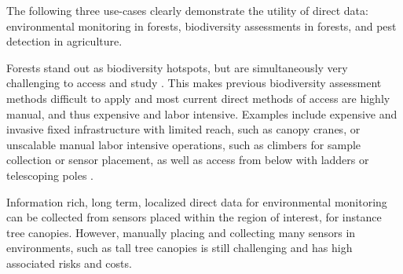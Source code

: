 The following three use-cases clearly demonstrate the utility of direct data: environmental monitoring in forests, biodiversity assessments in forests, and pest detection in agriculture.


Forests stand out as biodiversity hotspots, but are simultaneously very challenging to access and study \cite{Pillay2022, Ozanne2003d}. This makes previous biodiversity assessment methods difficult to apply and most current direct methods of access are highly manual, and thus expensive and labor intensive. Examples include expensive and invasive fixed infrastructure with limited reach, such as canopy cranes, or unscalable manual labor intensive operations, such as climbers for sample collection or sensor placement, as well as access from below with ladders or telescoping poles \cite{Cannon2021}. 

Information rich, long term, localized direct data for environmental monitoring can be collected from sensors placed within the region of interest, for instance tree canopies. 
However, manually placing and collecting many sensors in environments, such as tall tree canopies is still challenging and has high associated risks and costs.

